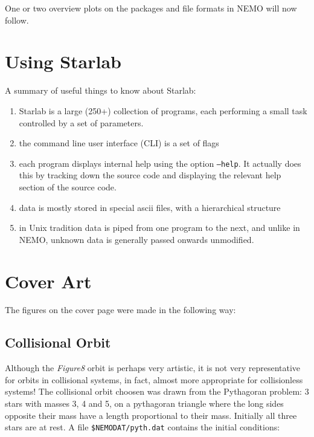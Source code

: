 One or two overview plots on the packages and file formats in NEMO will now follow.


\chapter                {Using Starlab}

A summary of useful things to know about Starlab:


\begin{enumerate}

\item
Starlab is a large (250+) collection of programs, each performing a small task
controlled by a set of parameters.

\item
the command line user interface (CLI) is a set of flags

\item
each program displays internal help using the option {\tt --help}.
It actually does this by tracking down the source code
and displaying the relevant help section of the source code.

\item
data is mostly stored in special ascii files, with a hierarchical structure

\item
in Unix tradition data is piped from one program to the next, and unlike
in NEMO, unknown data is generally passed onwards unmodified.

\end{enumerate}

\chapter                {Cover Art}

The figures on the cover page were made in the following way:

\section{Collisional Orbit}
\label{s:pyth} 

Although the {\it Figure8} orbit is perhaps very artistic, it is not very representative
for orbits in collisional systems, in fact, almost more appropriate
for collisionless systems!
The collisional orbit choosen was drawn from the Pythagoran problem:
3 stars with masses 3, 4 and 5, on a pythagoran triangle where the
long sides opposite their mass have a length proportional to 
their mass. Initially
all three stars are at rest. A file {\tt \$NEMODAT/pyth.dat} contains
the initial conditions:


